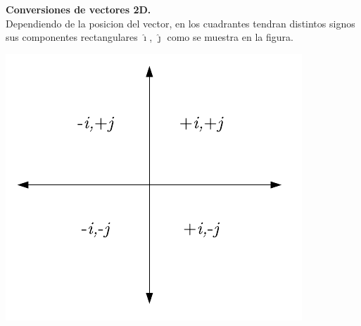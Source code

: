 \documentclass[10pt,a4paper]{article}
\begin{document}
\textbf{Conversiones de vectores 2D.}\\

Dependiendo de la posicion del vector, en los cuadrantes tendran distintos signos sus componentes rectangulares $\hat{\imath}$, $\hat{\jmath}$ como se muestra en la figura.
\begin{center}
\includegraphics[scale=1]{1}
\end{center}
\end{document}

